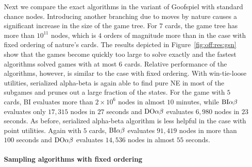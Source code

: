 {Next we compare the exact algorithms in the variant of Goofspiel with standard chance nodes.
Introducing another branching due to moves by nature causes a significant increase in the size of the game tree.
For $7$ cards, the game tree has more than $10^{11}$ nodes, which is $4$ orders of magnitude more than in the case with fixed ordering of nature's cards.
The results depicted in Figure~\ref{fig:off:res:gsn} show that the games become quickly too large to solve exactly and the fastest algorithms solved games with at most $6$ cards.
Relative performance of the algorithms, however, is similar to the case with fixed ordering.
With win-tie-loose utilities, serialized alpha-beta is again able to find pure NE in most of the subgames and prunes out a large fraction of the states.
For the game with $5$ cards, BI evaluates more than $2 \times 10^6$ nodes in almost $10$ minutes, while $\textrm{BI}\alpha\beta$ evaluates only $17,315$ nodes in $27$ seconds and $\textrm{DO}\alpha\beta$ evaluates $6,980$ nodes in $23$ seconds.
As before, serialized alpha-beta algorithm is less helpful in the case with point utilities.
Again with $5$ cards, $\textrm{BI}\alpha\beta$ evaluates $91,419$ nodes in more than $100$ seconds and $\textrm{DO}\alpha\beta$ evaluates $14,536$ nodes in almost $55$ seconds.
}

\paragraph{Sampling algorithms with fixed ordering}


